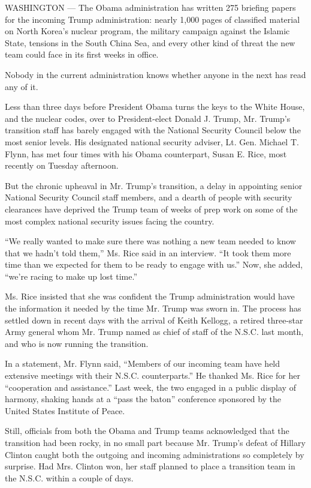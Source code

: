 WASHINGTON --- The Obama administration has written 275 briefing papers
for the incoming Trump administration: nearly 1,000 pages of classified
material on North Korea's nuclear program, the military campaign against
the Islamic State, tensions in the South China Sea, and every other kind
of threat the new team could face in its first weeks in office.

Nobody in the current administration knows whether anyone in the next
has read any of it.

Less than three days before President Obama turns the keys to the White
House, and the nuclear codes, over to President-elect Donald J. Trump,
Mr. Trump's transition staff has barely engaged with the National
Security Council below the most senior levels. His designated national
security adviser, Lt. Gen. Michael T. Flynn, has met four times with his
Obama counterpart, Susan E. Rice, most recently on Tuesday afternoon.

But the chronic upheaval in Mr. Trump's transition, a delay in
appointing senior National Security Council staff members, and a dearth
of people with security clearances have deprived the Trump team of weeks
of prep work on some of the most complex national security issues facing
the country.

``We really wanted to make sure there was nothing a new team needed to
know that we hadn't told them,'' Ms. Rice said in an interview. ``It
took them more time than we expected for them to be ready to engage with
us.'' Now, she added, ``we're racing to make up lost time.''

Ms. Rice insisted that she was confident the Trump administration would
have the information it needed by the time Mr. Trump was sworn in. The
process has settled down in recent days with the arrival of Keith
Kellogg, a retired three-star Army general whom Mr. Trump named as chief
of staff of the N.S.C. last month, and who is now running the
transition.

In a statement, Mr. Flynn said, ``Members of our incoming team have held
extensive meetings with their N.S.C. counterparts.'' He thanked Ms. Rice
for her ``cooperation and assistance.'' Last week, the two engaged in a
public display of harmony, shaking hands at a ``pass the baton''
conference sponsored by the United States Institute of Peace.

Still, officials from both the Obama and Trump teams acknowledged that
the transition had been rocky, in no small part because Mr. Trump's
defeat of Hillary Clinton caught both the outgoing and incoming
administrations so completely by surprise. Had Mrs. Clinton won, her
staff planned to place a transition team in the N.S.C. within a couple
of days.

